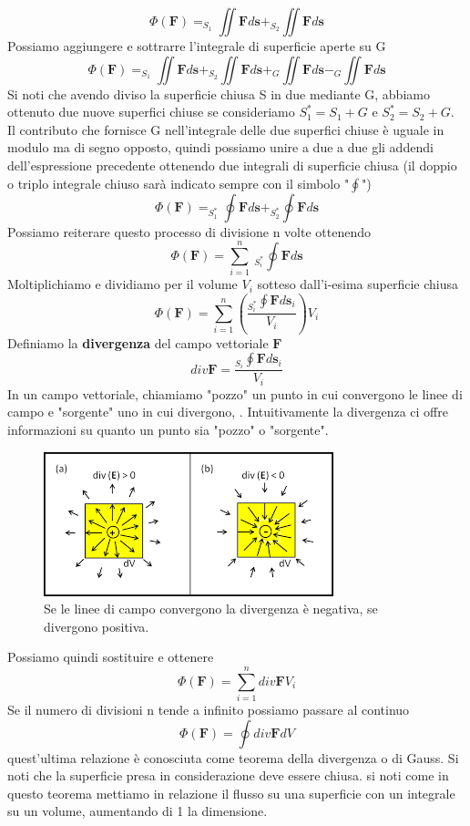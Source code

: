 \documentclass[10pt,a4paper]{article}
\begin{document}
\[\Phi(\mathbf{F}) = _{S_1}\iint \mathbf{F}d\mathbf{s}+_{S_2}\iint \mathbf{F}d\mathbf{s}\]
Possiamo aggiungere e sottrarre l'integrale di superficie aperte su G 
\[\Phi(\mathbf{F}) = _{S_1}\iint \mathbf{F}d\mathbf{s}+_{S_2}\iint \mathbf{F}d\mathbf{s}+_{G}\iint \mathbf{F}d\mathbf{s}-_{G}\iint \mathbf{F}d\mathbf{s}\]
Si noti che avendo diviso la superficie chiusa S in due mediante G, abbiamo ottenuto due nuove superfici chiuse se consideriamo \(S_1^* = S_1+G\) e \(S_2^* = S_2+G\). Il contributo che fornisce G nell'integrale delle due superfici chiuse è uguale in modulo ma di segno opposto, quindi possiamo unire a due a due gli addendi dell'espressione precedente ottenendo due integrali di superficie chiusa (il doppio o triplo integrale chiuso sarà indicato sempre con il simbolo "\(\oint\)")
\[\Phi(\mathbf{F}) = _{S_1^*}\oint \mathbf{F}d\mathbf{s}+_{S_2^*}\oint \mathbf{F}d\mathbf{s}\]
Possiamo reiterare questo processo di divisione n volte ottenendo
\[\Phi(\mathbf{F}) = \sum_{i=1}^{n}\ _{S_i^*}\oint \mathbf{F}d\mathbf{s}\]
Moltiplichiamo e dividiamo per il volume \(V_i\) sotteso dall'i-esima superficie chiusa
\[\Phi(\mathbf{F}) = \sum_{i=1}^{n}\left(\frac{_{S_i^*}\oint \mathbf{F}d\mathbf{s}_i}{V_i}\right)V_i\]
Definiamo la \textbf{divergenza} del campo vettoriale $\mathbf{F}$ 
\[div\mathbf{F} = \frac{_{S_i}\oint \mathbf{F}d\mathbf{s}_i}{V_i}\]
In un campo vettoriale, chiamiamo "pozzo" un punto in cui convergono le linee di campo e "sorgente" uno in cui divergono, . Intuitivamente la divergenza ci offre informazioni su quanto un punto sia "pozzo" o "sorgente". 
\begin{figure}[h!]
	\centering
	\includegraphics[width=0.6\linewidth]{images/div}
	\caption{Se le linee di campo convergono la divergenza è negativa, se divergono positiva.}
	\label{fig:div}
\end{figure}
\FloatBarrier
Possiamo quindi sostituire e ottenere
\[\Phi(\mathbf{F}) = \sum_{i=1}^{n}div\mathbf{F}V_i\]
Se il numero di divisioni n tende a infinito possiamo passare al continuo 
\[\Phi(\mathbf{F}) = \oint div\mathbf{F}dV\]
quest'ultima relazione è conosciuta come teorema della divergenza o di Gauss. Si noti che la superficie presa in considerazione deve essere chiusa. si noti come in questo teorema mettiamo in relazione il flusso su una superficie con un integrale su un volume, aumentando di 1 la dimensione.\\
\end{document}
